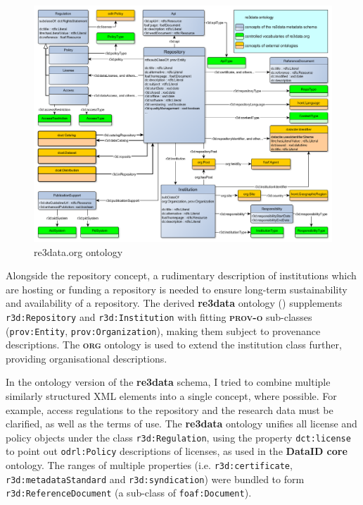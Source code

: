 \documentclass[a4paper,english,twoside,BCOR1.5cm,headsepline,DIV12,appendixprefix,final,12pt]{scrbook}
\newcommand{\core}{{\ttfamily\bfseries DataID core}\xspace}
\newcommand{\org}{{\scshape\bfseries org}\xspace}
\newcommand{\prov}{{\scshape\bfseries prov-o}\xspace}
\newcommand{\redata}{{\ttfamily\bfseries re3data}\xspace}
\newcommand{\prop}[1]{{{\texttt{#1}}}}
\begin{document}
\begin{figure}
\vspace*{-1.0cm}
\centering
\includegraphics[angle=90, width=\textwidth]{images/r3dOntologyReduced.png}
  \caption{re3data.org ontology}
  \label{fig:re3data}
\end{figure}

Alongside the repository concept, a rudimentary description of institutions which are hosting or funding a repository is needed to ensure long-term sustainability and availability of a repository. The derived \redata ontology () supplements \prop{r3d:Repository} and \prop{r3d:Institution} with fitting \prov sub-classes 
(\prop{prov:Entity}, \prop{prov:Organization}),
making them subject to provenance descriptions. The \org ontology is used to extend the institution class further, providing organisational descriptions.

In the ontology version of the \redata schema, I tried to combine multiple similarly structured XML elements into a single concept, where possible.
For example, access regulations to the repository and the research data must be clarified, as well as the terms of use. The \redata ontology unifies all license and policy objects under the class \prop{r3d:Regulation}, using the property \prop{dct:license} to point out \prop{odrl:Policy} descriptions of licenses, as used in the \core ontology.
The ranges of multiple properties (i.e. \prop{r3d:certificate}, \prop{r3d:metadataStandard} and \prop{r3d:syndication}) were bundled to form \prop{r3d:ReferenceDocument} (a sub-class of \prop{foaf:Document}).
\end{document}
